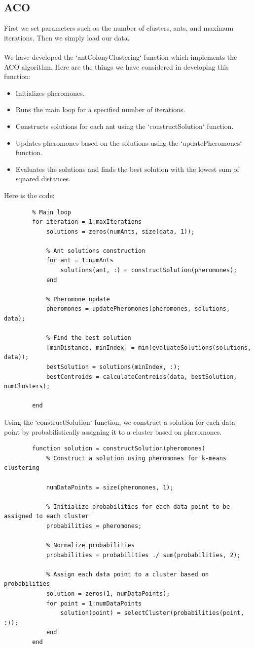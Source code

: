 \documentclass[]{article}
\begin{document}
	\subsection{ACO}
	First we set parameters such as the number of clusters, ants, and maximum iterations. Then we simply load our data.\\\\
	We have developed the `antColonyClustering` function which implements the ACO algorithm. Here are the things we have considered in developing this function:
	\begin{itemize}
		\item Initializes pheromones.
		\item Runs the main loop for a specified number of iterations.
		\item Constructs solutions for each ant using the `constructSolution` function.
		\item Updates pheromones based on the solutions using the `updatePheromones` function.
		\item Evaluates the solutions and finds the best solution with the lowest sum of squared distances.
	\end{itemize}
	Here is the code:
	\begin{lstlisting}
		% Main loop
		for iteration = 1:maxIterations
			solutions = zeros(numAnts, size(data, 1));
			
			% Ant solutions construction
			for ant = 1:numAnts
				solutions(ant, :) = constructSolution(pheromones);
			end
			
			% Pheromone update
			pheromones = updatePheromones(pheromones, solutions, data);
			
			% Find the best solution
			[minDistance, minIndex] = min(evaluateSolutions(solutions, data));
			bestSolution = solutions(minIndex, :);
			bestCentroids = calculateCentroids(data, bestSolution, numClusters);
			
		end
	\end{lstlisting}
	Using the `constructSolution` function, we construct a solution for each data point by probabilistically assigning it to a cluster based on pheromones.
	\begin{lstlisting}
		function solution = constructSolution(pheromones)
			% Construct a solution using pheromones for k-means clustering
			
			numDataPoints = size(pheromones, 1);
			
			% Initialize probabilities for each data point to be assigned to each cluster
			probabilities = pheromones;
			
			% Normalize probabilities
			probabilities = probabilities ./ sum(probabilities, 2);
			
			% Assign each data point to a cluster based on probabilities
			solution = zeros(1, numDataPoints);
			for point = 1:numDataPoints
				solution(point) = selectCluster(probabilities(point, :));
			end
		end
	\end{lstlisting}
\end{document}
